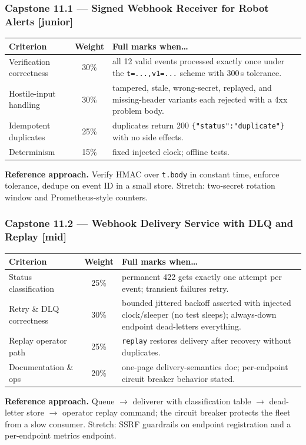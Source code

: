 \subsubsection*{Capstone 11.1 --- Signed Webhook Receiver for Robot Alerts [junior]}
\begin{center}\small
\begin{tabularx}{\textwidth}{l c X}
\toprule
\textbf{Criterion} & \textbf{Weight} & \textbf{Full marks when\ldots} \\
\midrule
Verification correctness & 30\% & all 12 valid events processed exactly once under the \texttt{t=...,v1=...} scheme with 300\,s tolerance. \\
Hostile-input handling & 30\% & tampered, stale, wrong-secret, replayed, and missing-header variants each rejected with a 4xx problem body. \\
Idempotent duplicates & 25\% & duplicates return 200 \texttt{\{"status":"duplicate"\}} with no side effects. \\
Determinism & 15\% & fixed injected clock; offline tests. \\
\bottomrule
\end{tabularx}
\end{center}
\textbf{Reference approach.} Verify HMAC over \texttt{t.body} in constant
time, enforce tolerance, dedupe on event ID in a small store. Stretch:
two-secret rotation window and Prometheus-style counters.

\subsubsection*{Capstone 11.2 --- Webhook Delivery Service with DLQ and Replay [mid]}
\begin{center}\small
\begin{tabularx}{\textwidth}{l c X}
\toprule
\textbf{Criterion} & \textbf{Weight} & \textbf{Full marks when\ldots} \\
\midrule
Status classification & 25\% & permanent 422 gets exactly one attempt per event; transient failures retry. \\
Retry \& DLQ correctness & 30\% & bounded jittered backoff asserted with injected clock/sleeper (no test sleeps); always-down endpoint dead-letters everything. \\
Replay operator path & 25\% & \texttt{replay} restores delivery after recovery without duplicates. \\
Documentation \& ops & 20\% & one-page delivery-semantics doc; per-endpoint circuit breaker behavior stated. \\
\bottomrule
\end{tabularx}
\end{center}
\textbf{Reference approach.} Queue $\to$ deliverer with classification
table $\to$ dead-letter store $\to$ operator replay command; the circuit
breaker protects the fleet from a slow consumer. Stretch: SSRF guardrails
on endpoint registration and a per-endpoint metrics endpoint.

